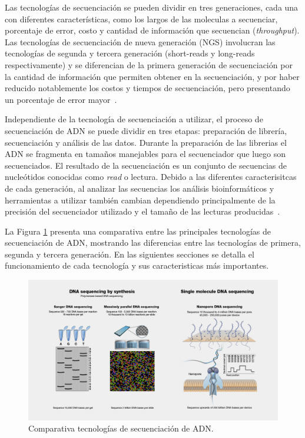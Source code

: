 Las tecnologías de secuenciación se pueden dividir en tres generaciones, cada una con diferentes características, como los largos de las moleculas a secuenciar, porcentaje de error, costo y cantidad de información que secuencian (\textit{throughput}).
Las tecnologías de secuenciación de nueva generación (NGS) involucran las tecnologías de segunda y tercera generación (short-reads y long-reads respectivamente) y se diferencian de la primera generación de secuenciación por la cantidad de información que permiten obtener en la secuenciación, y por haber reducido notablemente los costos y tiempos de secuenciación, pero presentando un porcentaje de error mayor~\cite{kumar2024next}. 

Independiente de la tecnología de secuenciación a utilizar, el proceso de secuenciación de ADN se puede dividir en tres etapas: preparación de librería, secuenciación y análisis de las datos. Durante la preparación de las librerias el ADN se fragmenta en tamaños manejables para el secuenciador que luego son secuenciados. El resultado de la secuenciación es un conjunto de secuencias de nucleótidos conocidas como \textit{read} o lectura.
Debido a las diferentes caracterisitcas de cada generación, al analizar las secuencias los análisis bioinformáticos y herramientas a utilizar también cambian dependiendo principalmente de la precisión del secuenciador utilizado y el tamaño de las lecturas producidas~\cite{bierman2014understanding}.


La Figura \ref{fig:DNA_sequencing} presenta una comparativa entre las principales tecnologías de secuenciación de ADN, mostrando las diferencias entre las tecnologías de primera, segunda y tercera generación. En las siguientes secciones se detalla el funcionamiento de cada tecnología y sus caracteristicas más importantes.
\begin{figure}[H]
    \centering
    \includegraphics[width=1\linewidth]{images/DNA-Sequencing.jpg}
    \caption[Comparativa tecnologías de secuenciación]{Comparativa tecnologías de secuenciación de ADN\protect\footnotemark.}
    \label{fig:DNA_sequencing}
\end{figure}
